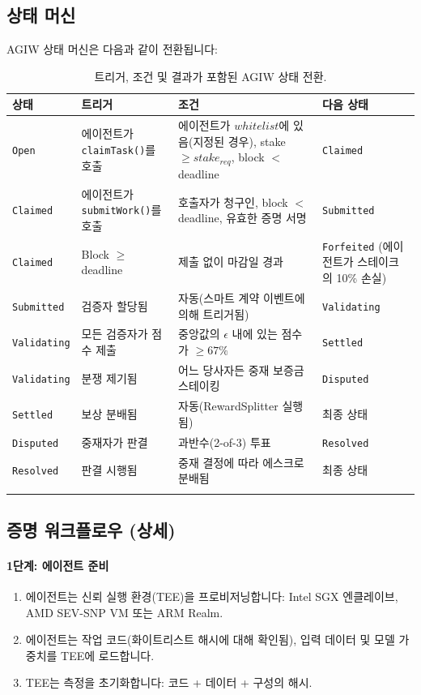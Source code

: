 \documentclass[11pt]{article}
\begin{document}
\subsection{상태 머신}
\label{sec:agiw-state-machine}
AGIW 상태 머신은 다음과 같이 전환됩니다:
\begin{longtable}{@{}p{}p{}p{}p{}@{}}
\toprule
\textbf{상태} & \textbf{트리거} & \textbf{조건} & \textbf{다음 상태} \\\midrule
\texttt{Open} & 에이전트가 \texttt{claimTask()}를 호출 & 에이전트가 $whitelist$에 있음(지정된 경우), stake $\geq stake_{req}$, block $<$ deadline & \texttt{Claimed} \\
\texttt{Claimed} & 에이전트가 \texttt{submitWork()}를 호출 & 호출자가 청구인, block $<$ deadline, 유효한 증명 서명 & \texttt{Submitted} \\
\texttt{Claimed} & Block $\geq$ deadline & 제출 없이 마감일 경과 & \texttt{Forfeited} (에이전트가 스테이크의 10\% 손실) \\
\texttt{Submitted} & 검증자 할당됨 & 자동(스마트 계약 이벤트에 의해 트리거됨) & \texttt{Validating} \\
\texttt{Validating} & 모든 검증자가 점수 제출 & 중앙값의 $\epsilon$ 내에 있는 점수가 $\geq 67\%$ & \texttt{Settled} \\
\texttt{Validating} & 분쟁 제기됨 & 어느 당사자든 중재 보증금 스테이킹 & \texttt{Disputed} \\
\texttt{Settled} & 보상 분배됨 & 자동(RewardSplitter 실행됨) & 최종 상태 \\
\texttt{Disputed} & 중재자가 판결 & 과반수(2-of-3) 투표 & \texttt{Resolved} \\
\texttt{Resolved} & 판결 시행됨 & 중재 결정에 따라 에스크로 분배됨 & 최종 상태 \\\bottomrule
\caption{트리거, 조건 및 결과가 포함된 AGIW 상태 전환.}
\label{tab:agiw-states}
\end{longtable}

\subsection{증명 워크플로우 (상세)}
\label{sec:attestation-workflow}
\paragraph{1단계: 에이전트 준비}
\begin{enumerate}[noitemsep]
  \item 에이전트는 신뢰 실행 환경(TEE)을 프로비저닝합니다: Intel SGX 엔클레이브, AMD SEV-SNP VM 또는 ARM Realm.
  \item 에이전트는 작업 코드(화이트리스트 해시에 대해 확인됨), 입력 데이터 및 모델 가중치를 TEE에 로드합니다.
  \item TEE는 측정을 초기화합니다: 코드 + 데이터 + 구성의 해시.
\end{enumerate}
\end{document}
